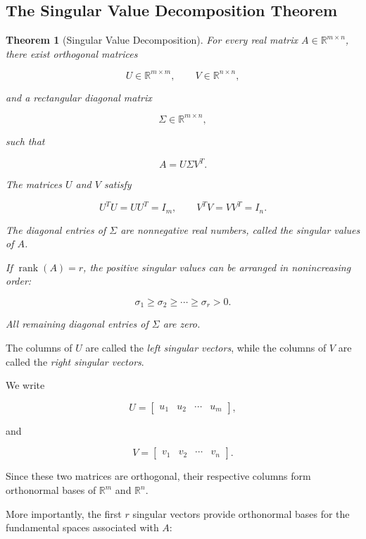 \documentclass[11pt]{article}
\newtheorem{theorem}{Theorem}[section]
\begin{document}
\subsection{The Singular Value Decomposition Theorem}

\begin{theorem}[Singular Value Decomposition]

For every real matrix
$A\in\mathbb{R}^{m\times n}$,
there exist orthogonal matrices

\[
U\in\mathbb{R}^{m\times m},
\qquad
V\in\mathbb{R}^{n\times n},
\]

and a rectangular diagonal matrix

\[
\Sigma\in\mathbb{R}^{m\times n},
\]

such that

\[
\boxed{A=U\Sigma V^T.}
\]

The matrices $U$ and $V$ satisfy

\[
U^TU=UU^T=I_m,
\qquad
V^TV=VV^T=I_n.
\]

The diagonal entries of $\Sigma$ are
nonnegative real numbers, called the
\textit{singular values} of $A$.

If $\operatorname{rank}(A)=r$, the positive
singular values can be arranged in
nonincreasing order:

\[
\sigma_1\geq\sigma_2\geq
\cdots\geq\sigma_r>0.
\]

All remaining diagonal entries of
$\Sigma$ are zero.

\end{theorem}

The columns of $U$ are called the
\textit{left singular vectors}, while
the columns of $V$ are called the
\textit{right singular vectors}.

We write

\[
U=
\begin{bmatrix}
u_1 & u_2 & \cdots & u_m
\end{bmatrix},
\]

and

\[
V=
\begin{bmatrix}
v_1 & v_2 & \cdots & v_n
\end{bmatrix}.
\]

Since these two matrices are orthogonal,
their respective columns form
orthonormal bases of $\mathbb{R}^m$
and $\mathbb{R}^n$.

More importantly, the first $r$
singular vectors provide orthonormal
bases for the fundamental spaces
associated with $A$:
\end{document}
